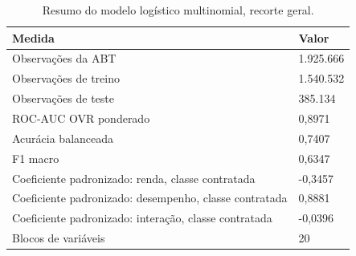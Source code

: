 \begin{table}
\caption{Resumo do modelo logístico multinomial, recorte geral.}
\label{tab:tabela_logit_ternario_recorte_geral_principal_holdout_80_20_e5}
\begin{tabular}{ll}
\toprule
Medida & Valor \\
\midrule
Observações da ABT & 1.925.666 \\
Observações de treino & 1.540.532 \\
Observações de teste & 385.134 \\
ROC-AUC OVR ponderado & 0,8971 \\
Acurácia balanceada & 0,7407 \\
F1 macro & 0,6347 \\
Coeficiente padronizado: renda, classe contratada & -0,3457 \\
Coeficiente padronizado: desempenho, classe contratada & 0,8881 \\
Coeficiente padronizado: interação, classe contratada & -0,0396 \\
Blocos de variáveis & 20 \\
\bottomrule
\end{tabular}
\end{table}
